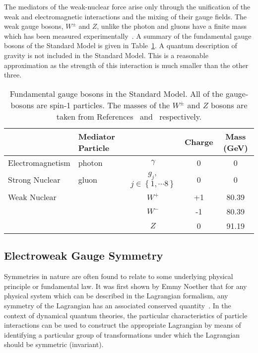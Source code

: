 The mediators of the weak-nuclear force arise only through 
the unification of the weak and electromagnetic interactions and the mixing
of their gauge fields. 
The weak gauge bosons, $W^{\pm}$ and $Z$, unlike the photon and gluons 
have a finite mass which has been measured experimentally~\citep{combinedWmass,pdg}.
A summary of the fundamental gauge bosons of the Standard Model is given in 
Table~\ref{tab:bosons}. A quantum description of gravity is not included in the Standard Model.
This is a reasonable approximation as the strength of this interaction 
is much smaller than the other three.
\begin{table}[htbp!]
\begin{tabular}{|l|l c|c|c|}
\hline 
	& \textbf{Mediator Particle} & & \textbf{Charge} & \textbf{Mass (GeV)} \\
\hline
Electromagnetism & photon & $\gamma$ 			& 0 & 0   \\
\hline
Strong Nuclear   & gluon  & $g_{j},$ $j\in\left\{1,\cdots8\right\}$ 	& 0 & 0   \\
\hline
Weak Nuclear 	 &  &  $W^{+}$ & +1 & 80.39 \\
	 	 &  &  $W^{-}$ & -1 & 80.39 \\
	 	 &  &  $Z$     & 0  & 91.19 \\
\hline
\end{tabular}
\caption{Fundamental gauge bosons in the Standard Model.
All of the gauge-bosons are spin-1 particles.
The masses of the $W^{\pm}$ and $Z$ bosons are taken from 
References~\citep{combinedWmass} and~\citep{pdg} respectively.}
\label{tab:bosons}
\end{table}

\subsection{Electroweak Gauge Symmetry}
\label{sec:ewksymmetry}

Symmetries in nature are often found to relate to some underlying physical principle 
or fundamental law. It was first shown by Emmy Noether 
that for any physical system which can be described in the Lagrangian formalism,
any symmetry of the Lagrangian has an associated conserved quantity~\cite{null}.
In the context of dynamical quantum theories, the particular characteristics of 
particle interactions can be used to construct the appropriate Lagrangian 
by means of identifying a particular group of transformations under which 
the Lagrangian should be symmetric (invariant). 


